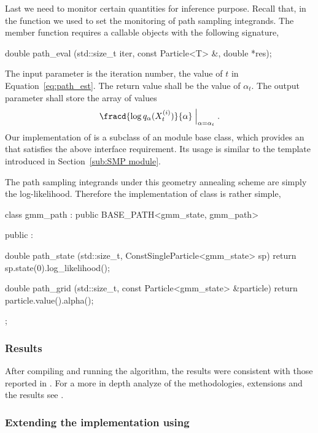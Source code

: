 \documentclass[11pt, fontset=Minion, showoverfull,
bib, mintcode, minted=cache]{marticle}
\begin{document}
Last we need to monitor certain quantities for inference purpose. Recall that,
in the  function we used
 to set the monitoring of path
sampling integrands. The  member function requires a
callable objects with the following signature,
\begin{cppcode}
double path_eval (std::size_t iter, const Particle<T> &, double *res);
\end{cppcode}
The input parameter  is the iteration number, the value of $t$
in Equation~\ref{eq:path_est}. The return value shall be the value of
$\alpha_t$.  The output parameter  shall store the array of
values
\begin{equation*}
  \fracd{\log q_{\alpha}(X_t^{(i)})}{\alpha}\Bigm|_{\alpha = \alpha_t}.
\end{equation*}
Our implementation of  is a subclass of an \smp module
base class, which provides an  that satisfies the above
interface requirement. Its usage is similar to the 
template introduced in Section~\ref{sub:SMP module}.

The path sampling integrands under this geometry annealing scheme are simply
the log-likelihood. Therefore the implementation of  class
is rather simple,
\begin{cppcode}
class gmm_path : public BASE_PATH<gmm_state, gmm_path>
{
    public :

    double path_state (std::size_t, ConstSingleParticle<gmm_state> sp)
    {return sp.state(0).log_likelihood();}

    double path_grid (std::size_t, const Particle<gmm_state> &particle)
    {return particle.value().alpha();}
};
\end{cppcode}

\subsubsection{Results}

After compiling and running the algorithm, the results were consistent with
those reported in \textcite{DelMoral:2006hc}. For a more in depth analyze of the
methodologies, extensions and the results see \textcite{Zhou2013mc}.

\subsubsection[Extending the implementation using MPI]{Extending the
  implementation using \mpi}
\end{document}
